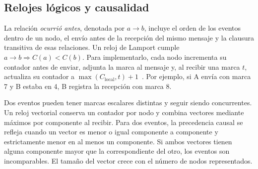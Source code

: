 \subsection{Relojes lógicos y causalidad}
La relación \emph{ocurrió antes}, denotada por \(a\to b\), incluye el orden de los eventos dentro de un nodo, el envío antes de la recepción del mismo mensaje y la clausura transitiva de esas relaciones. Un reloj de Lamport cumple \(a\to b\Rightarrow C(a)<C(b)\). Para implementarlo, cada nodo incrementa su contador antes de enviar, adjunta la marca al mensaje y, al recibir una marca \(t\), actualiza su contador a \(\max(C_{\mathrm{local}},t)+1\)~\cite{emanuel_lamport1978}. Por ejemplo, si A envía con marca 7 y B estaba en 4, B registra la recepción con marca 8.

Dos eventos pueden tener marcas escalares distintas y seguir siendo concurrentes. Un reloj vectorial conserva un contador por nodo y combina vectores mediante máximos por componente al recibir. Para dos eventos, la precedencia causal se refleja cuando un vector es menor o igual componente a componente y estrictamente menor en al menos un componente. Si ambos vectores tienen alguna componente mayor que la correspondiente del otro, los eventos son incomparables. El tamaño del vector crece con el número de nodos representados.
